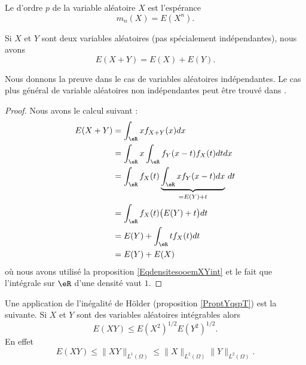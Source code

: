 Le  d'ordre \( p\) de la variable aléatoire \( X\) est l'espérance
\begin{equation}
    m_n(X)=E(X^n).
\end{equation}

\begin{proposition} \label{PropZBnsCgh}
    Si \( X\) et \( Y\) sont deux variables aléatoires (pas spécialement indépendantes), nous avons
    \begin{equation}
        E(X+Y)=E(X)+E(Y).
    \end{equation}
\end{proposition}

Nous donnons la preuve dans le cas de variables aléatoires indépendantes. Le cas plus général de variable aléatoires non indépendantes peut être trouvé dans \cite{Marazzi}.
\begin{proof}
    Nous avons le calcul suivant :
    \begin{subequations}
        \begin{align}
            E(X+Y)&=\int_{\eR}xf_{X+Y}(x)dx\\
            &=\int_{\eR}x\int_{\eR}f_Y(x-t)f_X(t)dtdx\\
            &=\int_{\eR}f_X(t)\underbrace{\int_{\eR}xf_Y(x-t)dx}_{=E(Y)+t}\,dt\\
            &=\int_{\eR}f_X(t)\big( E(Y)+t \big)dt\\
            &=E(Y)+\int_{\eR}tf_X(t)dt\\
            &=E(Y)+E(X)
        \end{align}
    \end{subequations}
    où nous avons utilisé la proposition \ref{EqdensitesooemXYint} et le fait que l'intégrale sur \( \eR\) d'une densité vaut \( 1\).
\end{proof}

Une application de l'inégalité de Hölder (proposition \ref{ProptYqspT}) est la suivante. Si \( X\) et \( Y\) sont des variables aléatoires intégrables alors
\begin{equation}
    E(XY)\leq E(X^2)^{1/2}E(Y^2)^{1/2}.
\end{equation}
En effet
\begin{equation}    \label{EqEXYleqXdYdNormHolder}
    E(XY)\leq \| XY \|_{L^1(\Omega)}\leq \| X \|_{L^2(\Omega)}\| Y \|_{L^2(\Omega)}.
\end{equation}

